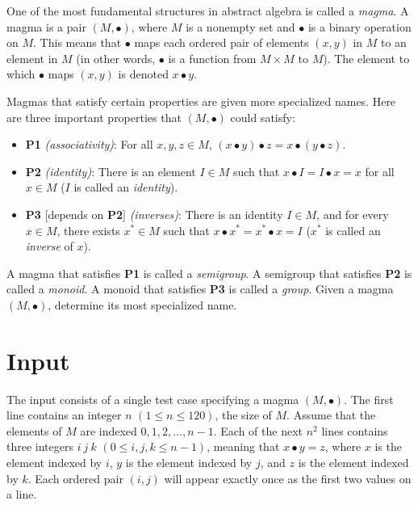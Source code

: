 

One of the most fundamental structures in abstract algebra is called a \emph{magma}.
A magma is a pair $(M,\bullet)$, where $M$ is a nonempty set and $\bullet$ is a
binary operation on $M$. This means that $\bullet$ maps each ordered pair
of elements $(x,y)$ in $M$ to an element in $M$ (in other words, $\bullet$ is
a function from $M \times M$ to $M$). The element to which $\bullet$ maps $(x,y)$
is denoted $x \bullet y$.

Magmas that satisfy certain properties are given more specialized names.
Here are three important properties that $(M,\bullet)$ could satisfy:

\begin{itemize}
    \item \textbf{P1} \emph{(associativity)}:  For all $x,y,z \in M$,
    $(x \bullet y) \bullet z = x \bullet (y \bullet z)$.

    \item \textbf{P2} \emph{(identity)}:  There is an element $I \in M$ such that
    $x \bullet I = I \bullet x = x$ for all $x \in M$ ($I$ is called an \emph{identity}).

    \item \textbf{P3} [depends on \textbf{P2}] \emph{(inverses)}:  There is an
    identity $I \in M$, and for every $x \in M$, there exists $x^* \in M$ such that
    $x \bullet x^* = x^* \bullet x = I$ ($x^*$ is called an \emph{inverse} of $x$).
\end{itemize}

A magma that satisfies \textbf{P1} is called a \emph{semigroup}.
A semigroup that satisfies \textbf{P2} is called a \emph{monoid}.
A monoid that satisfies \textbf{P3} is called a \emph{group}.
Given a magma $(M,\bullet)$, determine its most specialized name.


\section*{Input}

The input consists of a single test case specifying a magma $(M,\bullet)$.
The first line contains an integer $n$ $(1 \leq n \leq 120)$, the size of $M$.
Assume that the elements of $M$ are indexed $0,1,2,\ldots,n-1$.
Each of the next $n^2$ lines contains three integers $i~j~k$
$(0 \leq i,j,k \leq n-1)$, meaning that $x \bullet y = z$, where $x$
is the element indexed by $i$, $y$ is the element indexed by $j$, and $z$
is the element indexed by $k$. Each ordered pair $(i,j)$ will appear exactly once
as the first two values on a line.


